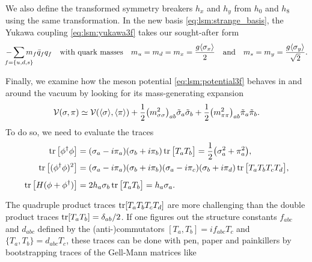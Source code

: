 We also define the transformed symmetry breakers $h_x$ and $h_y$ from $h_0$ and $h_8$ using the same transformation.
In the new basis \eqref{eq:lsm:strange_basis}, the Yukawa coupling \eqref{eq:lsm:yukawa3f} takes our sought-after form
\begin{equation}
	- \smashoperator{\sum_{f=\{u,d,s\}}} m_f \bar{q}_f q_f
	\quad \text{with quark masses} \quad
	m_u = m_d = m_x = \frac{g \avg{\sigma_x}}{2}
	\quad \text{and} \quad
	m_s = m_y = \frac{g \avg{\sigma_y}}{\sqrt{2}}.
\label{eq:lsm:quark_masses_3f}
\end{equation}

Finally, we examine how the meson potential \eqref{eq:lsm:potential3f} behaves in and around the vacuum
by looking for its mass-generating expansion
\begin{equation}
	\mathcal{V}(\sigma,\pi) \simeq \mathcal{V}(\langle \sigma \rangle,\langle \pi \rangle) + \frac12 \big(m^2_{\sigma\sigma}\big)_{ab} \tilde{\sigma}_a \tilde{\sigma}_b + \frac12 \big(m^2_{\pi\pi}\big)_{ab} \tilde{\pi}_a \tilde{\pi}_b.
\label{eq:lsm3f:potential_before_diagonalization}
\end{equation}
To do so, we need to evaluate the traces
\begin{subequations}
\begin{align}
	\operatorname{tr}\big[\phi^\dagger \phi\big]     &= (\sigma_a - i \pi_a) (\sigma_b + i \pi_b) \operatorname{tr} \big[ T_a T_b \big] = \frac12 \big(\sigma_a^2+\pi_a^2\big) , \\
	\operatorname{tr}\big[(\phi^\dagger \phi)^2\big] &= (\sigma_a - i \pi_a) (\sigma_b + i \pi_b) (\sigma_a - i \pi_c) (\sigma_b + i \pi_d) \operatorname{tr} \big[ T_a T_b T_c T_d \big], \\
	\operatorname{tr}\big[H(\phi+\phi^\dagger)\big]  &= 2 h_a \sigma_b \operatorname{tr} \big[ T_a T_b \big] = \vphantom{\frac12} h_a \sigma_a . \label{eq:lsm3f:traces_hphi}
\end{align}%
\label{eq:lsm3f:traces}%
\end{subequations}%
The quadruple product traces $\operatorname{tr}[T_a T_b T_c T_d]$ are more challenging than the double product traces $\operatorname{tr}[T_a T_b] = \delta_{ab}/2$.
If one figures out the structure constants $f_{abc}$ and $d_{abc}$
defined by the (anti-)commutators $[T_a,T_b]=i f_{abc} T_c$ and $\{T_a,T_b\}=d_{abc} T_c$,
these traces can be done with pen, paper and painkillers
by bootstrapping traces of the Gell-Mann matrices like
